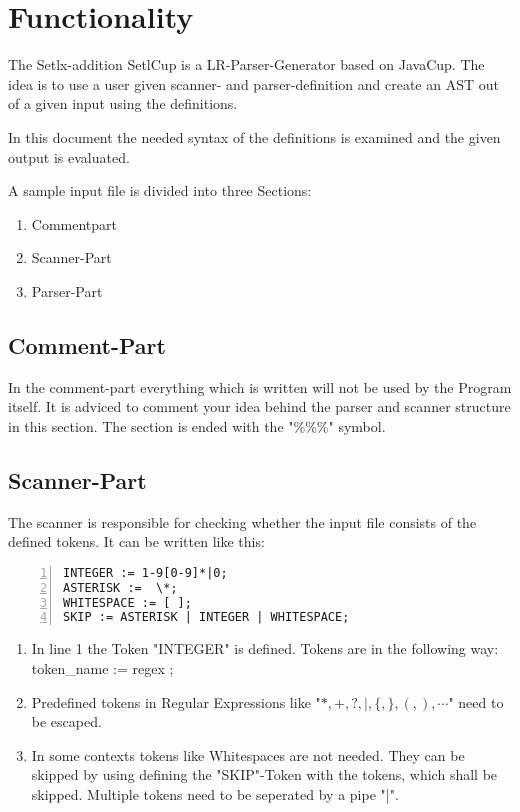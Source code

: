 \chapter{Functionality}

The Setlx-addition SetlCup is a LR-Parser-Generator based on JavaCup.
The idea is to use a user given scanner- and parser-definition and create an AST out of a given input using the definitions.

In this document the needed syntax of the definitions is examined and the given output is evaluated.

A sample input file is divided into three Sections:
\begin{enumerate}
	\item Commentpart
	\item Scanner-Part
	\item Parser-Part
\end{enumerate}

\section{Comment-Part}
In the comment-part everything which is written will not be used by the Program itself. It is adviced to comment your idea behind the parser and scanner structure in this section.
The section is ended with the "\%\%\%" symbol.

\section{Scanner-Part}
The scanner is responsible for checking whether the input file consists of the defined tokens. It can be written like this:
\begin{lstlisting}[frame=single,numbers=left,basicstyle=\footnotesize]
INTEGER := 1-9[0-9]*|0;
ASTERISK :=  \*;
WHITESPACE := [ ];
SKIP := ASTERISK | INTEGER | WHITESPACE;
\end{lstlisting}
\begin{enumerate}
	\item In line 1 the Token "INTEGER" is defined. Tokens are in the following way:\\
					token\_name := regex ;
	\item Predefined tokens in Regular Expressions like "$*,+,?,|,\{,\},(,),\cdots$" need to be escaped.
	\item In some contexts tokens like Whitespaces are not needed. They can be skipped by using defining the "SKIP"-Token with the tokens, which shall be skipped. Multiple tokens need to be seperated by a pipe "|".
\end{enumerate}

